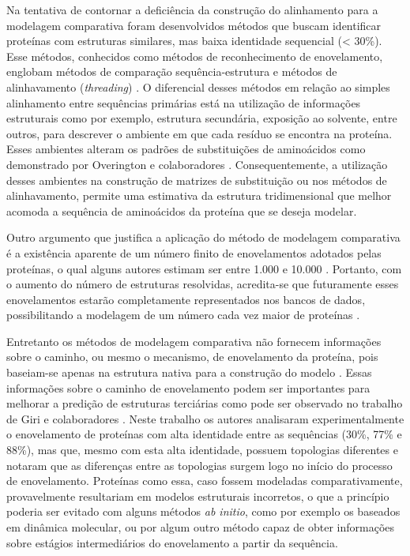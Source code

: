 Na tentativa de contornar a deficiência da construção do alinhamento para a modelagem comparativa foram desenvolvidos métodos que buscam identificar proteínas com estruturas similares, mas baixa identidade sequencial (< 30\%). Esse métodos, conhecidos como métodos de reconhecimento de enovelamento, englobam métodos de comparação sequência-estrutura e métodos de alinhavamento (\textit{threading}) \cite{Dunbrack2006}. O diferencial desses métodos em relação ao simples alinhamento entre sequências primárias está na utilização de informações estruturais como por exemplo, estrutura secundária, exposição ao solvente, entre outros, para descrever o ambiente em que cada resíduo se encontra na proteína. Esses ambientes alteram os padrões de substituições de aminoácidos como demonstrado por Overington e colaboradores \cite{Overington1990}. Consequentemente, a utilização desses ambientes na construção de matrizes de substituição ou nos métodos de alinhavamento, permite uma estimativa da estrutura tridimensional que melhor acomoda a sequência de aminoácidos da proteína que se deseja modelar.

Outro argumento que justifica a aplicação do método de modelagem comparativa é a existência aparente de um número finito de enovelamentos adotados pelas proteínas, o qual alguns autores estimam ser entre 1.000 e 10.000 \cite{Chothia1992a, Coulson2002}. Portanto, com o aumento do número de estruturas resolvidas, acredita-se que futuramente esses enovelamentos estarão completamente representados nos bancos de dados, possibilitando a modelagem de um número cada vez maior de proteínas \cite{Kolodny2013}.

Entretanto os métodos de modelagem comparativa não fornecem informações sobre o caminho, ou mesmo o mecanismo, de enovelamento da proteína, pois baseiam-se apenas na estrutura nativa para a construção do modelo \cite{Helles2008}. Essas informações sobre o caminho de enovelamento podem ser importantes para melhorar a predição de estruturas terciárias como pode ser observado no trabalho de Giri e colaboradores \cite{Giri2012}. Neste trabalho os autores analisaram experimentalmente o enovelamento de proteínas com alta identidade entre as sequências (30\%, 77\% e 88\%), mas que, mesmo com esta alta identidade, possuem topologias diferentes e notaram que as diferenças entre as topologias surgem logo no início do processo de enovelamento. Proteínas como essa, caso fossem modeladas comparativamente, provavelmente resultariam em modelos estruturais incorretos, o que a princípio poderia ser evitado com alguns métodos \textit{ab initio}, como por exemplo os baseados em dinâmica molecular, ou por algum outro método capaz de obter informações sobre estágios intermediários do enovelamento a partir da sequência.

